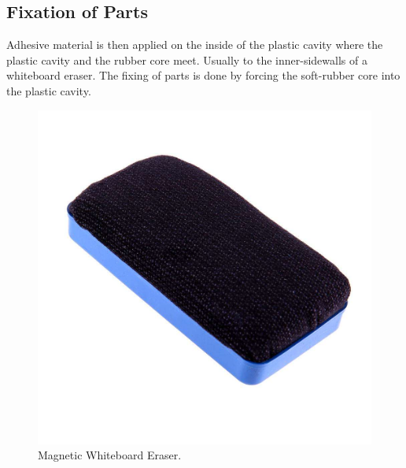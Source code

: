 \documentclass[12pt,a4paper,oneside]{article}
\newcommand\blankpage{%
    \null
    \thispagestyle{empty}%
    \addtocounter{page}{-1}%
    \newpage}
\begin{document}
\subsection{Fixation of Parts}

Adhesive material is then applied on the inside of the plastic cavity where the plastic cavity and the rubber core meet. Usually to the inner-sidewalls of a whiteboard eraser. The fixing of parts is done by forcing the soft-rubber core into the plastic cavity. 


\begin{figure}[h]
    \includegraphics[width=1\textwidth]{whiteboard-magnetic}
    \caption{Magnetic Whiteboard Eraser.}
\end{figure}
\newpage

\clearpage
{}
\printbibliography
\afterpage{\blankpage}
\end{document}
